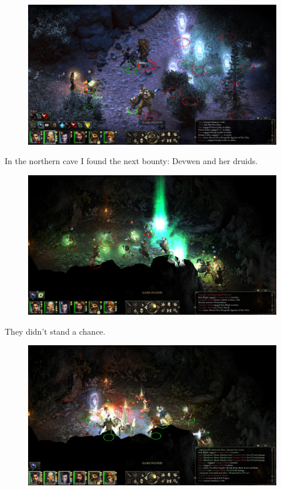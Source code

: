 \documentclass{article}
\begin{document}
\begin{figure}
\includegraphics[scale=0.33]{files/blog/2019_03_04_pillars_of_eternity_path_of_the_damned_act_iii/2019_03_04_northweald01.jpg}
\end{figure}

In the northern cave I found the next bounty: Devwen and her druids.

\begin{figure}
\includegraphics[scale=0.33]{files/blog/2019_03_04_pillars_of_eternity_path_of_the_damned_act_iii/2019_03_04_northweald02.jpg}
\end{figure}

They didn't stand a chance.

\begin{figure}
\includegraphics[scale=0.33]{files/blog/2019_03_04_pillars_of_eternity_path_of_the_damned_act_iii/2019_03_04_northweald03.jpg}
\end{figure}
\end{document}
